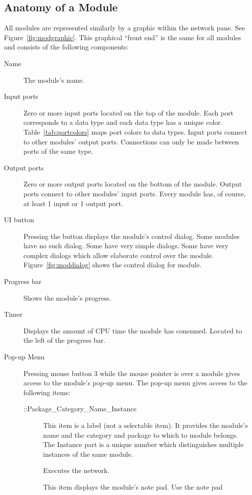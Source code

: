 \subsection{Anatomy of a Module}
\label{sec:modanatomy}

All modules are represented similarly by a graphic within the network pane.
See Figure~\ref{fig:modgraphic}. This graphical ``front end'' is the same
for all modules and consists of the following components:

\begin{description}
\item[Name] The module's name.
\item[Input ports] Zero or more input ports located on the top of the
  module.  Each port corresponds to a data type and each data type has a
  unique color.  Table~\ref{tab:portcolors} maps port colors to data types.
  Input ports connect to other modules' output ports.  Connections can only
  be made between ports of the same type.
\item[Output ports] Zero or more output ports located on the bottom of the
  module.  Output ports connect to other modules' input ports.  Every
  module has, of course, at least 1 input or 1 output port.
\item[UI button] Pressing the  button displays the module's
  control dialog. Some modules have no such dialog. Some have very simple
  dialogs.  Some have very complex dialogs which allow elaborate control
  over the module.  Figure~\ref{fig:moddialog} shows the control dialog for
   module.
\item[Progress bar] Shows the module's progress.
\item[Timer] Displays the amount of CPU time the module has consumed.
  Located to the left of the progress bar.
\item[Pop-up Menu] Pressing mouse button 3 while the mouse
  pointer is over a module gives access to the module's pop-up menu.  The
  pop-up menu gives access to the following items:
  \begin{description}
  \item[::Package\_Category\_Name\_Instance] This item is a label (not a
    selectable item).  It provides the module's name and the category and
    package to which to module belongs.  The Instance part is a unique
    number which distinguishes multiple instances of the same module.
  \item[] Executes the network.
  \item[] This item displays the module's note pad.  Use the note pad

\end{description}
\end{description}
